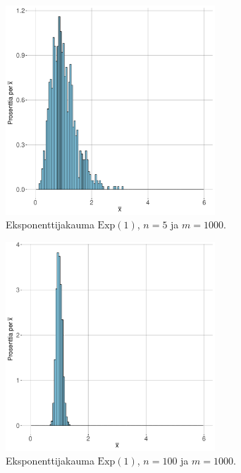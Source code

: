 \documentclass{beamer}
\begin{document}
\begin{frame}
  \begin{center}
    \begin{figure}
      \includegraphics[width=0.7\textwidth, height=0.7\textwidth]{exp-n-5.pdf}
      \caption{Eksponenttijakauma $\mathrm{Exp}\left(1\right)$, $n = 5$ ja $m = 1000$.}
  \end{figure}
\end{center}
\end{frame}


\begin{frame}
  \begin{center}
    \begin{figure}
      \includegraphics[width=0.7\textwidth, height=0.7\textwidth]{exp-n-100.pdf}
      \caption{Eksponenttijakauma $\mathrm{Exp}\left(1\right)$, $n = 100$ ja $m = 1000$.}
  \end{figure}
\end{center}
\end{frame}
\end{document}
